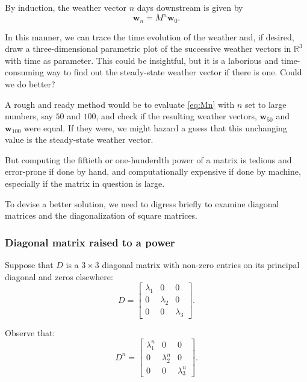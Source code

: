 \documentclass[
  11pt,
  a4paper,
]{article}
\begin{document}
By induction, the weather vector \(n\) days downstream is given by
\begin{equation}
\symbf{w}_{n} = M^{n}\symbf{w}_{0}.
\label{eq:Mn}\end{equation}

In this manner, we can trace the time evolution of the weather and, if
desired, draw a three-dimensional parametric plot of the successive
weather vectors in \(\mathbb{R}^{3}\) with time as parameter. This could
be insightful, but it is a laborious and time-consuming way to find out
the steady-state weather vector if there is one. Could we do better?

A rough and ready method would be to evaluate \cref{eq:Mn} with \(n\)
set to large numbers, say \(50\) and \(100\), and check if the resulting
weather vectors, \(\symbf{w}_{50}\) and \(\symbf{w}_{100}\) were equal.
If they were, we might hazard a guess that this unchanging value is the
steady-state weather vector.

But computing the fiftieth or one-hunderdth power of a matrix is tedious
and error-prone if done by hand, and computationally expensive if done
by machine, especially if the matrix in question is large.

To devise a better solution, we need to digress briefly to examine
diagonal matrices and the diagonalization of square matrices.

\hypertarget{diagonal-matrix-raised-to-a-power}{%
\subsubsection{Diagonal matrix raised to a
power}\label{diagonal-matrix-raised-to-a-power}}

Suppose that \(D\) is a \(3 \times 3\) diagonal matrix with non-zero
entries on its principal diagonal and zeros elsewhere: \[
D = \begin{bmatrix}
\lambda_{1} & 0 & 0\\
0 & \lambda_{2} & 0\\
0 & 0 & \lambda_{3}
\end{bmatrix}.
\]

Observe that: \begin{equation}
D^{n} = \begin{bmatrix}
\lambda_{1}^{n}& 0 & 0\\
0 & \lambda_{2} ^{n}& 0\\
0 & 0 & \lambda_{3}^{n}
\end{bmatrix}.
\label{eq:D-to-the-n}\end{equation}
\end{document}
